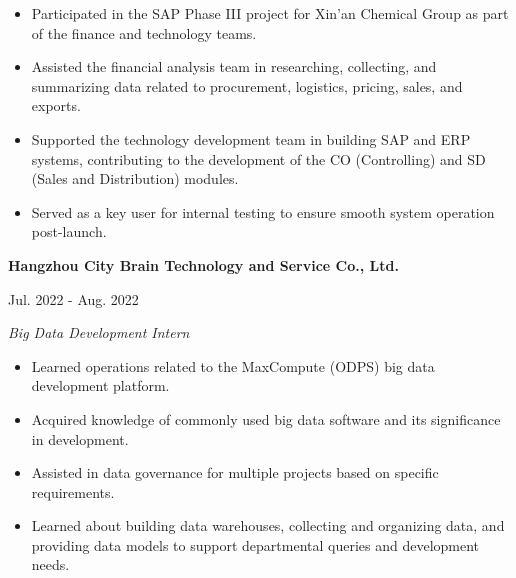\documentclass[
  16,
]{article}
\providecommand{\tightlist}{%
  \setlength{\itemsep}{0pt}\setlength{\parskip}{0pt}}\usepackage{longtable,booktabs,array}
\begin{document}
\begin{itemize}
\tightlist
\item
  Participated in the SAP Phase III project for Xin'an Chemical Group as
  part of the finance and technology teams.
\item
  Assisted the financial analysis team in researching, collecting, and
  summarizing data related to procurement, logistics, pricing, sales,
  and exports.
\item
  Supported the technology development team in building SAP and ERP
  systems, contributing to the development of the CO (Controlling) and
  SD (Sales and Distribution) modules.
\item
  Served as a key user for internal testing to ensure smooth system
  operation post-launch.
\end{itemize}

\vspace{7pt}

\begin{large}
  \begin{multicols}{2}
    \parbox{1.4\linewidth}{\bf Hangzhou City Brain Technology and Service Co., Ltd.}
    \begin{flushright}Jul. 2022 - Aug. 2022\end{flushright}
  \end{multicols}
  \vspace{-0.17cm}
  \begin{multicols}{2}
    \begin{flushleft}\textit{Big Data Development Intern}\end{flushleft}
    \begin{flushright}  \end{flushright}\end
  {multicols}
\end{large}
\vspace{-0.16cm}

\begin{itemize}
\tightlist
\item
  Learned operations related to the MaxCompute (ODPS) big data
  development platform.
\item
  Acquired knowledge of commonly used big data software and its
  significance in development.
\item
  Assisted in data governance for multiple projects based on specific
  requirements.
\item
  Learned about building data warehouses, collecting and organizing
  data, and providing data models to support departmental queries and
  development needs.
\end{itemize}
\end{document}
